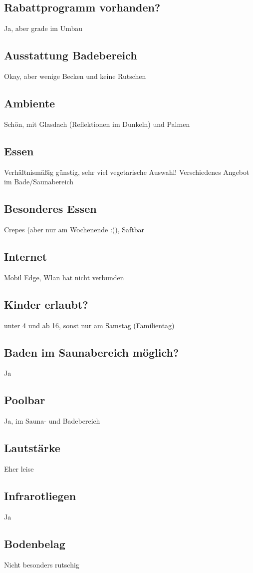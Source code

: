 \documentclass{article}
\begin{document}
\subsection*{Rabattprogramm vorhanden?} Ja, aber grade im Umbau 
\subsection*{Ausstattung Badebereich} Okay, aber wenige Becken und keine Rutschen
\subsection*{Ambiente} Schön, mit Glasdach (Reflektionen im Dunkeln) und Palmen
\subsection*{Essen} Verhältnismäßig günstig, sehr viel vegetarische Auswahl! Verschiedenes Angebot im Bade/Saunabereich
\subsection*{Besonderes Essen} Crepes (aber nur am Wochenende :(), Saftbar
\subsection*{Internet} Mobil Edge, Wlan hat nicht verbunden
\subsection*{Kinder erlaubt?} unter 4 und ab 16, sonst nur am Samstag (Familientag)
\subsection*{Baden im Saunabereich möglich?} Ja
\subsection*{Poolbar} Ja, im Sauna- und Badebereich
\subsection*{Lautstärke} Eher leise
\subsection*{Infrarotliegen} Ja
\subsection*{Bodenbelag} Nicht besonders rutschig
\pagebreak
\end{document}
